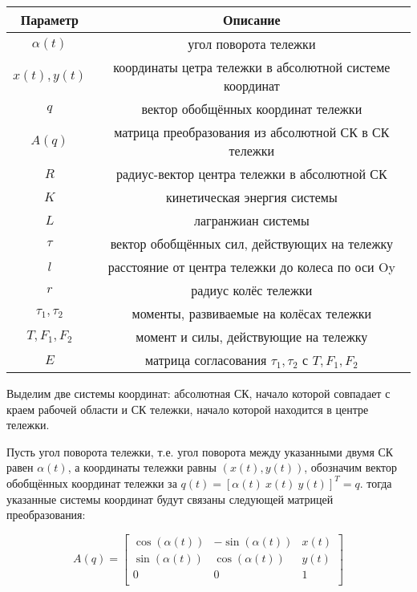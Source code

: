 \documentclass[fleqn, a4paper, 12pt, russian]{article}
\begin{document}
	\begin{center}
		\begin{tabular}{|c|c|}
			\hline
			Параметр & Описание \\ \hline
			$\alpha(t)$& угол поворота тележки\\ \hline
			$x(t),y(t)$& координаты цетра тележки в абсолютной системе координат\\ \hline
			$q$ & вектор обобщённых координат тележки\\ \hline
			$A(q)$ & матрица преобразования из абсолютной СК в СК тележки\\ \hline
			$R$ & радиус-вектор центра тележки в абсолютной СК\\ \hline
			$K$ & кинетическая энергия системы\\ \hline
			$L$ & лагранжиан системы\\ \hline
			$\tau$ & вектор обобщённых сил, действующих на тележку \\ \hline
			$l$ & расстояние от центра тележки до колеса по оси Oy\\ \hline
			$r$ & радиус колёс тележки \\ \hline
			$\tau_1, \tau_2$ & моменты, развиваемые на колёсах тележки \\ \hline
			$T,F_1, F_2$ & момент и силы, действующие на тележку \\ \hline
			$E$& матрица согласования $\tau_1, \tau_2$ с 	$T,F_1, F_2$ \\ \hline
			
		\end{tabular}
	\end{center}

	Выделим две системы координат: абсолютная СК, начало которой совпадает с краем рабочей области и СК тележки, начало которой находится в центре тележки.
	
	Пусть угол поворота тележки, т.е. угол поворота между указанными двумя СК равен $\alpha(t)$, а координаты тележки равны $(x(t),y(t))$, обозначим вектор обобщённых координат тележки за $q(t) = [\alpha(t)~x(t)~y(t)]^T=q$. тогда указанные системы координат будут связаны следующей матрицей преобразования: 
	
	
	
	\begin{equation}
		A(q)=\begin{bmatrix}
		\cos(\alpha(t)) & -\sin(\alpha(t)) &x(t)\\
		\sin(\alpha(t)) &  \cos(\alpha(t)) & y(t)\\
		0    &     0 &         1  \\
		\end{bmatrix}
	\end{equation}
	
\end{document}
